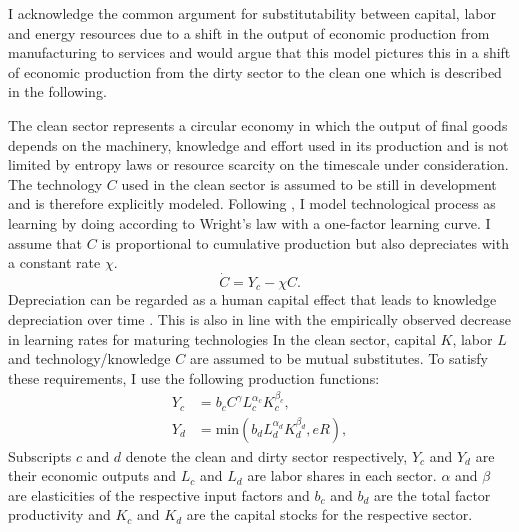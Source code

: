 I acknowledge the common argument for substitutability between capital, labor and energy resources due to a shift in the output of economic production from manufacturing to services and would argue that this model pictures this in a shift of economic production from the dirty sector to the clean one which is described in the following.

The clean sector represents a circular economy in which the output of final goods depends on the machinery, knowledge and effort used in its production and is not limited by entropy laws or resource scarcity on the timescale under consideration. The technology $C$ used in the clean sector is assumed to be still in development and is therefore explicitly modeled.
Following \cite{argote1990learning}, I model technological process as learning by doing according to Wright's law \citep{wright1936factors, Nagy2013} with a one-factor learning curve. I assume that $C$ is proportional to cumulative production but also depreciates with a constant rate $\chi$. 
\begin{equation}
	\dot{C} = Y_c - \chi C.
	\label{eq:learning_by_doing}
\end{equation}
Depreciation can be regarded as a human capital effect that leads to knowledge depreciation over time \citep{Kahouli-Brahmi2008}. This is also in line with the empirically observed decrease in learning rates for maturing technologies \citep{argote1990learning}
In the clean sector, capital $K$, labor $L$ and technology/knowledge $C$ are assumed to be mutual substitutes. To satisfy these requirements, I use the following production functions:
\begin{align}
	Y_c &= b_c C^{\gamma} L_c^{\alpha_c}K_c^{\beta_c}, \label{eq:clean_production} \\
	Y_d &= \mathrm{ min}\left( b_d L_d^{\alpha_d}K_d^{\beta_d}, e R \right), \label{eq:dirty_production}
\end{align}
Subscripts $c$ and $d$ denote the clean and dirty sector respectively, $Y_c$ and $Y_d$ are their economic outputs and $L_c$ and $L_d$ are labor shares in each sector. $\alpha$ and $\beta$ are elasticities of the respective input factors and $b_c$ and $b_d$ are the total factor productivity and $K_c$ and $K_d$ are the capital stocks for the respective sector.


